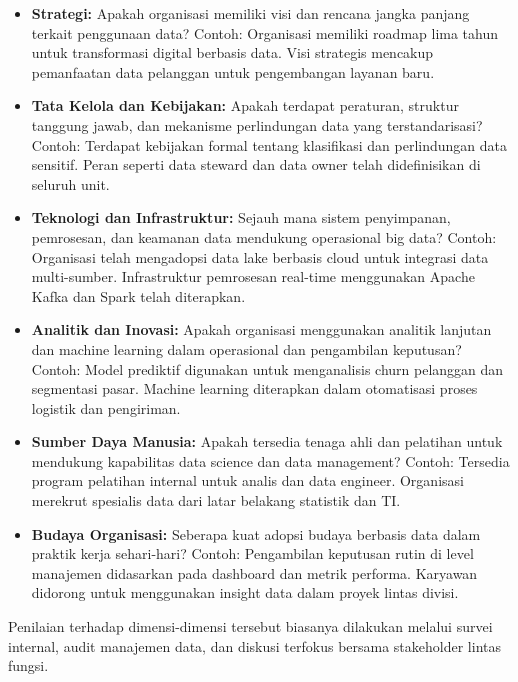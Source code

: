 \begin{itemize}
	\item \textbf{Strategi:} Apakah organisasi memiliki visi dan rencana jangka panjang terkait penggunaan data? Contoh: Organisasi memiliki roadmap lima tahun untuk transformasi digital berbasis data. Visi strategis mencakup pemanfaatan data pelanggan untuk pengembangan layanan baru.
	
	\item \textbf{Tata Kelola dan Kebijakan:} Apakah terdapat peraturan, struktur tanggung jawab, dan mekanisme perlindungan data yang terstandarisasi? Contoh: Terdapat kebijakan formal tentang klasifikasi dan perlindungan data sensitif. Peran seperti data steward dan data owner telah didefinisikan di seluruh unit.
	
	\item \textbf{Teknologi dan Infrastruktur:} Sejauh mana sistem penyimpanan, pemrosesan, dan keamanan data mendukung operasional big data? Contoh: Organisasi telah mengadopsi data lake berbasis cloud untuk integrasi data multi-sumber. Infrastruktur pemrosesan real-time menggunakan Apache Kafka dan Spark telah diterapkan.
	
	\item \textbf{Analitik dan Inovasi:} Apakah organisasi menggunakan analitik lanjutan dan machine learning dalam operasional dan pengambilan keputusan? Contoh: Model prediktif digunakan untuk menganalisis churn pelanggan dan segmentasi pasar. Machine learning diterapkan dalam otomatisasi proses logistik dan pengiriman.
	
	\item \textbf{Sumber Daya Manusia:} Apakah tersedia tenaga ahli dan pelatihan untuk mendukung kapabilitas data science dan data management? Contoh: Tersedia program pelatihan internal untuk analis dan data engineer. Organisasi merekrut spesialis data dari latar belakang statistik dan TI.
	
	\item \textbf{Budaya Organisasi:} Seberapa kuat adopsi budaya berbasis data dalam praktik kerja sehari-hari? Contoh: Pengambilan keputusan rutin di level manajemen didasarkan pada dashboard dan metrik performa. Karyawan didorong untuk menggunakan insight data dalam proyek lintas divisi.
\end{itemize}


Penilaian terhadap dimensi-dimensi tersebut biasanya dilakukan melalui survei internal, audit manajemen data, dan diskusi terfokus bersama stakeholder lintas fungsi.

